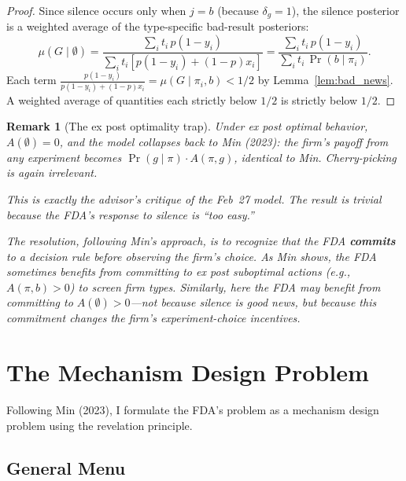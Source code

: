 \documentclass[12pt,a4paper]{article}
\newtheorem{remark}{Remark}
\begin{document}
\begin{proof}
Since silence occurs only when $j = b$ (because $\delta_g = 1$),
the silence posterior is a weighted average of the type-specific
bad-result posteriors:
\[
  \mu(G \mid \emptyset)
  = \frac{\sum_i t_i \, p(1-y_i)}
         {\sum_i t_i [p(1-y_i) + (1-p)x_i]}
  = \frac{\sum_i t_i \, p(1-y_i)}
         {\sum_i t_i \, \Pr(b \mid \pi_i)}.
\]
Each term $\frac{p(1-y_i)}{p(1-y_i) + (1-p)x_i}
= \mu(G \mid \pi_i, b) < 1/2$ by Lemma~\ref{lem:bad_news}.
A weighted average of quantities each strictly below $1/2$
is strictly below $1/2$.
\end{proof}

\begin{remark}[The ex post optimality trap]
Under ex post optimal behavior, $A(\emptyset) = 0$, and the
model collapses back to Min (2023): the firm's payoff from any
experiment becomes $\Pr(g \mid \pi) \cdot A(\pi, g)$,
identical to Min. Cherry-picking is again irrelevant.

This is exactly the advisor's critique of the Feb~27 model.
The result is trivial because the FDA's response to silence is
``too easy.''

The resolution, following Min's approach, is to recognize that
the FDA \textbf{commits} to a decision rule \emph{before}
observing the firm's choice. As Min shows, the FDA sometimes
benefits from committing to ex post suboptimal actions (e.g.,
$A(\pi, b) > 0$) to screen firm types. Similarly, here the FDA
may benefit from committing to $A(\emptyset) > 0$---not
because silence is good news, but because this commitment
changes the firm's experiment-choice incentives.
\end{remark}


\section{The Mechanism Design Problem}
\label{sec:mechanism}

Following Min (2023), I formulate the FDA's problem as a
mechanism design problem using the revelation principle.

\subsection{General Menu}
\end{document}
